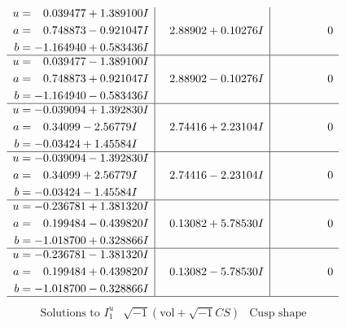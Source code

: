 \documentclass[1p]{elsarticle_modified}
\theoremstyle{definition}
\newcommand{\I}{\sqrt{-1}}
\begin{document}
$$\begin{array}{c|c|c}
\begin{aligned}
u &= \phantom{-}0.039477 + 1.389100 I \\
a &= \phantom{-}0.748873 - 0.921047 I \\
b &= -1.164940 + 0.583436 I\end{aligned}
 & \phantom{-}2.88902 + 0.10276 I & \phantom{-0.000000 } 0 \\ \hline\begin{aligned}
u &= \phantom{-}0.039477 - 1.389100 I \\
a &= \phantom{-}0.748873 + 0.921047 I \\
b &= -1.164940 - 0.583436 I\end{aligned}
 & \phantom{-}2.88902 - 0.10276 I & \phantom{-0.000000 } 0 \\ \hline\begin{aligned}
u &= -0.039094 + 1.392830 I \\
a &= \phantom{-}0.34099 - 2.56779 I \\
b &= -0.03424 + 1.45584 I\end{aligned}
 & \phantom{-}2.74416 + 2.23104 I & \phantom{-0.000000 } 0 \\ \hline\begin{aligned}
u &= -0.039094 - 1.392830 I \\
a &= \phantom{-}0.34099 + 2.56779 I \\
b &= -0.03424 - 1.45584 I\end{aligned}
 & \phantom{-}2.74416 - 2.23104 I & \phantom{-0.000000 } 0 \\ \hline\begin{aligned}
u &= -0.236781 + 1.381320 I \\
a &= \phantom{-}0.199484 - 0.439820 I \\
b &= -1.018700 + 0.328866 I\end{aligned}
 & \phantom{-}0.13082 + 5.78530 I & \phantom{-0.000000 } 0 \\ \hline\begin{aligned}
u &= -0.236781 - 1.381320 I \\
a &= \phantom{-}0.199484 + 0.439820 I \\
b &= -1.018700 - 0.328866 I\end{aligned}
 & \phantom{-}0.13082 - 5.78530 I & \phantom{-0.000000 } 0\\
 \hline 
 \end{array}$$\newpage$$\begin{array}{c|c|c}  
\text{Solutions to }I^u_{1}& \I (\text{vol} + \sqrt{-1}CS) & \text{Cusp shape}\\
 \hline 
\begin{aligned}

\end{aligned}
\end{array}$$
\end{document}
